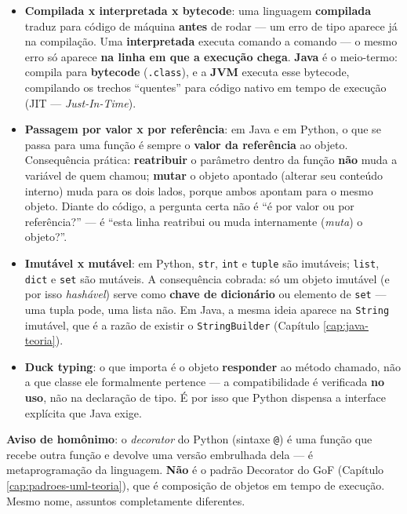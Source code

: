 \begin{conceito}
\begin{itemize}
\item \textbf{Compilada x interpretada x bytecode}: uma linguagem
\textbf{compilada} traduz para código de máquina \textbf{antes} de rodar
--- um erro de tipo aparece já na compilação. Uma \textbf{interpretada}
executa comando a comando --- o mesmo erro só aparece \textbf{na linha em
que a execução chega}. \textbf{Java} é o meio-termo: compila para
\textbf{bytecode} (\texttt{.class}), e a \textbf{JVM} executa esse
bytecode, compilando os trechos “quentes” para código nativo em tempo de
execução (JIT --- \textit{Just-In-Time}).
\item \textbf{Passagem por valor x por referência}: em Java e em Python,
o que se passa para uma função é sempre o \textbf{valor da referência} ao
objeto. Consequência prática: \textbf{reatribuir} o parâmetro dentro da
função \textbf{não} muda a variável de quem chamou; \textbf{mutar} o
objeto apontado (alterar seu conteúdo interno) muda para os dois lados,
porque ambos apontam para o mesmo objeto. Diante do código, a pergunta
certa não é “é por valor ou por referência?” --- é “esta linha reatribui
ou muda internamente (\textit{muta}) o objeto?”.
\item \textbf{Imutável x mutável}: em Python, \texttt{str}, \texttt{int}
e \texttt{tuple} são imutáveis; \texttt{list}, \texttt{dict} e
\texttt{set} são mutáveis. A consequência cobrada: só um objeto imutável
(e por isso \textit{hashável}) serve como \textbf{chave de dicionário} ou
elemento de \texttt{set} --- uma tupla pode, uma lista não. Em Java, a
mesma ideia aparece na \texttt{String} imutável, que é a razão de existir
o \texttt{StringBuilder} (Capítulo \ref{cap:java-teoria}).
\item \textbf{Duck typing}: o que importa é o objeto \textbf{responder}
ao método chamado, não a que classe ele formalmente pertence --- a
compatibilidade é verificada \textbf{no uso}, não na declaração de tipo. É
por isso que Python dispensa a interface explícita que Java exige.
\end{itemize}

\textbf{Aviso de homônimo}: o \textit{decorator} do Python (sintaxe
\texttt{@}) é uma função que recebe outra função e devolve uma versão
embrulhada dela --- é metaprogramação da linguagem. \textbf{Não} é o
padrão Decorator do GoF (Capítulo \ref{cap:padroes-uml-teoria}), que é
composição de objetos em tempo de execução. Mesmo nome, assuntos
completamente diferentes.
\end{conceito}

